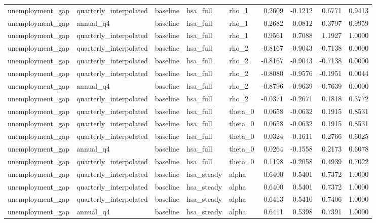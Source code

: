 \begin{tabular}{lllllrrrr}
unemployment\_gap & quarterly\_interpolated & baseline & hsa\_full & rho\_1 & 0.2609 & -0.1212 & 0.6771 & 0.9413 \\
unemployment\_gap & annual\_q4 & baseline & hsa\_full & rho\_1 & 0.2682 & 0.0812 & 0.3797 & 0.9959 \\
unemployment\_gap & quarterly\_interpolated & baseline & hsa\_full & rho\_1 & 0.9561 & 0.7088 & 1.1927 & 1.0000 \\
unemployment\_gap & quarterly\_interpolated & baseline & hsa\_full & rho\_2 & -0.8167 & -0.9043 & -0.7138 & 0.0000 \\
unemployment\_gap & quarterly\_interpolated & baseline & hsa\_full & rho\_2 & -0.8167 & -0.9043 & -0.7138 & 0.0000 \\
unemployment\_gap & quarterly\_interpolated & baseline & hsa\_full & rho\_2 & -0.8080 & -0.9576 & -0.1951 & 0.0044 \\
unemployment\_gap & annual\_q4 & baseline & hsa\_full & rho\_2 & -0.8796 & -0.9639 & -0.7639 & 0.0000 \\
unemployment\_gap & quarterly\_interpolated & baseline & hsa\_full & rho\_2 & -0.0371 & -0.2671 & 0.1818 & 0.3772 \\
unemployment\_gap & quarterly\_interpolated & baseline & hsa\_full & theta\_0 & 0.0658 & -0.0632 & 0.1915 & 0.8531 \\
unemployment\_gap & quarterly\_interpolated & baseline & hsa\_full & theta\_0 & 0.0658 & -0.0632 & 0.1915 & 0.8531 \\
unemployment\_gap & quarterly\_interpolated & baseline & hsa\_full & theta\_0 & 0.0324 & -0.1611 & 0.2766 & 0.6025 \\
unemployment\_gap & annual\_q4 & baseline & hsa\_full & theta\_0 & 0.0264 & -0.1558 & 0.2173 & 0.6078 \\
unemployment\_gap & quarterly\_interpolated & baseline & hsa\_full & theta\_0 & 0.1198 & -0.2058 & 0.4939 & 0.7022 \\
unemployment\_gap & quarterly\_interpolated & baseline & hsa\_steady & alpha & 0.6400 & 0.5401 & 0.7372 & 1.0000 \\
unemployment\_gap & quarterly\_interpolated & baseline & hsa\_steady & alpha & 0.6400 & 0.5401 & 0.7372 & 1.0000 \\
unemployment\_gap & quarterly\_interpolated & baseline & hsa\_steady & alpha & 0.6413 & 0.5410 & 0.7406 & 1.0000 \\
unemployment\_gap & annual\_q4 & baseline & hsa\_steady & alpha & 0.6411 & 0.5398 & 0.7391 & 1.0000 \\

\end{tabular}
